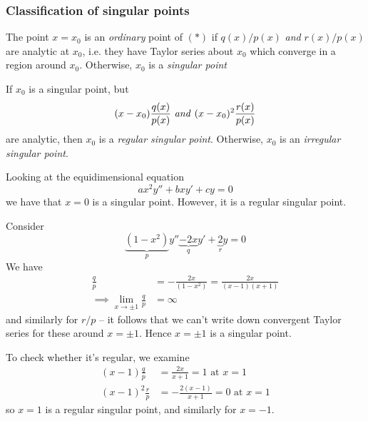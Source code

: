 \documentclass{../template/note}
\begin{document}

    \subsubsection{Classification of singular points}
    
    \begin{definition}
        The point \(x=x_0\) is an \emph{ordinary} point of \((*)\) if \(q(x)/p(x)\) \emph{and} \(r(x)/p(x)\) are analytic at \(x_0\), i.e. they have Taylor series about \(x_0\) which converge in a region around \(x_0\). Otherwise, \(x_0\) is a \emph{singular point}
    \end{definition}
    
    \begin{definition}
        If \(x_0\) is a singular point, but
        \[
            (x-x_0)\frac{q(x)}{p(x)} \text{ \emph{and} } (x-x_0)^2\frac{r(x)}{p(x)}
        \]
        are analytic, then \(x_0\) is a \emph{regular singular point}. Otherwise, \(x_0\) is an \emph{irregular singular point}.
    \end{definition}
    
    \begin{example}
        Looking at the equidimensional equation
        \[
            ax^2y'' + bxy' + cy = 0
        \]
        we have that \(x=0\) is a singular point. However, it is a regular singular point.
    \end{example}
    
    \begin{example}
        Consider
        \[
            \underbrace{(1-x^2)}_{p}y'' \underbrace{- 2x}_{q}y' + \underbrace{2}_{r}y = 0
        \]
        We have
        \begin{align*}
            \frac{q}{p} &= -\frac{2x}{(1-x^2)} = \frac{2x}{(x-1)(x+1)} \\
            \implies \lim_{x \to \pm 1} \frac{q}{p} &= \infty
        \end{align*}
        and similarly for \(r/p\) -- it follows that we can't write down convergent Taylor series for these around \(x = \pm 1\). Hence \(x = \pm 1\) is a singular point.

        To check whether it's regular, we examine
        \begin{align*}
            (x-1)\frac{q}{p} &= \frac{2x}{x+1} = 1 \text{ at } x = 1 \\
            (x-1)^2\frac{r}{p} &= -\frac{2(x-1)}{x+1} = 0 \text{ at } x = 1
        \end{align*}
        so \(x = 1\) is a regular singular point, and similarly for \(x=-1\).
    \end{example}
    
\end{document}
